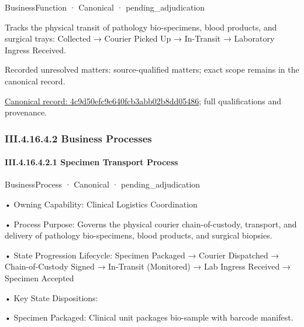 \label{element:4c9d50efc9e640fcb3abb02b8dd05486}
{\small BusinessFunction · Canonical · pending\_adjudication}\par

Tracks the physical transit of pathology bio-specimens, blood products, and surgical trays: Collected → Courier Picked Up → In-Transit → Laboratory Ingress Received.


{\small Recorded unresolved matters: source-qualified matters; exact scope remains in the canonical record.}\par
{\footnotesize \href{../../../../../../../continuum/business/business-function/4c9d50efc9e640fcb3abb02b8dd05486.md}{Canonical record: 4c9d50efc9e640fcb3abb02b8dd05486}; full qualifications and provenance.}\par
\subsubsection*{III.4.16.4.2 Business Processes}
\label{navigation:III.4.16.4.2}

\paragraph*{III.4.16.4.2.1 Specimen Transport Process}
\label{navigation:III.4.16.4.2.1}

\label{element:11bb000294fc44a8af295f4682e2fe6c}
{\small BusinessProcess · Canonical · pending\_adjudication}\par

•
Owning Capability: Clinical Logistics Coordination



•
Process Purpose: Governs the physical courier chain-of-custody, transport, and delivery of pathology bio-specimens, blood products, and surgical biopsies.



•
State Progression Lifecycle: Specimen Packaged → Courier Dispatched → Chain-of-Custody Signed → In-Transit (Monitored) → Lab Ingress Received → Specimen Accepted



•
Key State Dispositions:



•
Specimen Packaged: Clinical unit packages bio-sample with barcode manifest.



